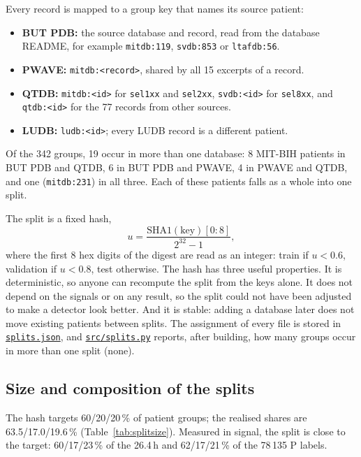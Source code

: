 \documentclass[11pt,a4paper]{article}
\newcommand{\code}[1]{\texttt{#1}}
\newcommand{\repourl}{https://github.com/BierschneiderEmanuel/pWaveDetection}
\newcommand{\repofile}[2]{\href{\repourl/blob/main/#2}{\code{#1}}}
\begin{document}
Every record is mapped to a group key that names its source patient:
\begin{itemize}
\item \textbf{BUT PDB:} the source database and record, read from the database README, for example \code{mitdb:119}, \code{svdb:853} or \code{ltafdb:56}.
\item \textbf{PWAVE:} \code{mitdb:<record>}, shared by all 15 excerpts of a record.
\item \textbf{QTDB:} \code{mitdb:<id>} for \code{sel1xx} and \code{sel2xx}, \code{svdb:<id>} for \code{sel8xx}, and \code{qtdb:<id>} for the 77 records from other sources.
\item \textbf{LUDB:} \code{ludb:<id>}; every LUDB record is a different patient.
\end{itemize}
Of the 342 groups, 19 occur in more than one database: 8 MIT-BIH patients in BUT PDB and QTDB, 6 in BUT PDB and PWAVE, 4 in PWAVE and QTDB, and one (\code{mitdb:231}) in all three. Each of these patients falls as a whole into one split.

The split is a fixed hash,
\begin{equation}
u = \frac{\mathrm{SHA1}(\mathrm{key})[0{:}8]}{2^{32} - 1},
\end{equation}
where the first 8 hex digits of the digest are read as an integer: train if $u < 0.6$, validation if $u < 0.8$, test otherwise. The hash has three useful properties. It is deterministic, so anyone can recompute the split from the keys alone. It does not depend on the signals or on any result, so the split could not have been adjusted to make a detector look better. And it is stable: adding a database later does not move existing patients between splits. The assignment of every file is stored in \repofile{splits.json}{splits.json}, and \repofile{src/splits.py}{src/splits.py} reports, after building, how many groups occur in more than one split (none).

\subsection{Size and composition of the splits}

The hash targets 60/20/20\,\% of patient groups; the realised shares are 63.5/17.0/19.6\,\% (Table~\ref{tab:splitsize}). Measured in signal, the split is close to the target: 60/17/23\,\% of the 26.4\,h and 62/17/21\,\% of the 78\,135 P labels.
\end{document}
